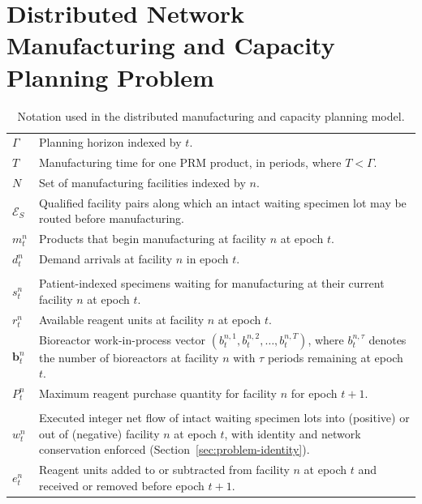 \documentclass[preprint,review,12pt]{elsarticle}
\begin{document}
\section{Distributed Network Manufacturing and Capacity Planning Problem}
\label{sec:problem}
\begin{table}[htbp]
\centering
\caption{Notation used in the distributed manufacturing and capacity planning model.}
\label{tab:notation}
\footnotesize
\setlength{\tabcolsep}{4pt}
\renewcommand{\arraystretch}{1.08}
\begin{tabularx}{\textwidth}{>{\raggedright\arraybackslash}p{} >{\raggedright\arraybackslash}X}
\toprule
\multicolumn{2}{c}{\textbf{Sets and parameters}} \\
\midrule
$\Gamma$ & Planning horizon indexed by $t$. \\
$T$ & Manufacturing time for one PRM product, in periods, where $T<\Gamma$. \\
$N$ & Set of manufacturing facilities indexed by $n$. \\
$\mathcal{E}_{S}$ & Qualified facility pairs along which an intact waiting specimen lot may be routed before manufacturing. \\
$m_t^n$ & Products that begin manufacturing at facility $n$ at epoch $t$. \\
$d_t^n$ & Demand arrivals at facility $n$ in epoch $t$. \\
\midrule
\multicolumn{2}{c}{\textbf{State variables}} \\
\midrule
$s_t^n$ & Patient-indexed specimens waiting for manufacturing at their current facility $n$ at epoch $t$. \\
$r_t^n$ & Available reagent units at facility $n$ at epoch $t$. \\
$\mathbf{b}_t^n$ & Bioreactor work-in-process vector $(b_t^{n,1}, b_t^{n,2}, \ldots, b_t^{n,T})$, where $b_t^{n,\tau}$ denotes the number of bioreactors at facility $n$ with $\tau$ periods remaining at epoch $t$. \\
$P_t^n$ & Maximum reagent purchase quantity for facility $n$ for epoch $t+1$. \\
\midrule
\multicolumn{2}{c}{\textbf{Decision variables}} \\
\midrule
$w_t^n$ & Executed integer net flow of intact waiting specimen lots into (positive) or out of (negative) facility $n$ at epoch $t$, with identity and network conservation enforced (Section~\ref{sec:problem-identity}). \\
$e_t^n$ & Reagent units added to or subtracted from facility $n$ at epoch $t$ and received or removed before epoch $t+1$. \\

\end{tabularx}
\end{table}
\end{document}
